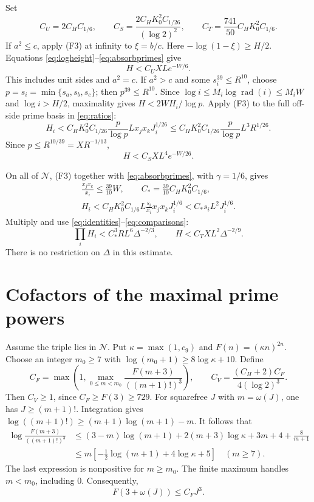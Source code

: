 \documentclass{amsart}
\theoremstyle{remark}
\newcommand{\rad}{\operatorname{rad}}
\numberwithin{equation}{section}
\begin{document}
Set
\begin{equation}\label{eq:outerconstants}
C_U=2C_HC_{1/6},\qquad
C_S=\frac{2C_HK_0^2C_{1/26}}{(\log2)^2},\qquad
C_T=\frac{741}{50}C_HK_0^2C_{1/6}.
\end{equation}
If $a^2\le c$, apply (F3) at infinity to $\xi=b/c$.
Here $-\log(1-\xi)\ge H/2$.
Equations \eqref{eq:logheight}--\eqref{eq:absorbprimes} give
\begin{equation}\label{eq:U}
H<C_U XL e^{-W/6}.
\end{equation}
This includes unit sides and $a^2=c$.
If $a^2>c$ and some $s_i^{39}\le R^{10}$, choose
$p=s_i=\min\{s_a,s_b,s_c\}$; then $p^{39}\le R^{10}$.
Since $\log i\le M_i\log\rad(i)\le M_iW$ and $\log i>H/2$,
maximality gives $H<2WH_i/\log p$.
Apply (F3) to the full off-side prime basis in \eqref{eq:ratios}:
\[
H_i<C_HK_0^2C_{1/26}\frac p{\log p}Lx_jx_kJ_i^{1/26}
 \le C_HK_0^2C_{1/26}\frac p{\log p}L^3R^{1/26}.
\]
Since $p\le R^{10/39}=X R^{-1/13}$,
\begin{equation}\label{eq:S}
H<C_S XL^4e^{-W/26}.
\end{equation}

On all of $\mathcal N$, (F3) together with \eqref{eq:absorbprimes},
with $\gamma=1/6$, gives
\[
\begin{gathered}
\frac{x_jx_k}{x_i}\le\frac{39}{10}W,\qquad
C_*=\frac{39}{10}C_HK_0^2C_{1/6},\\
H_i<C_HK_0^2C_{1/6}L\frac{s_i}{x_i}x_jx_kJ_i^{1/6}
 <C_*s_iL^2J_i^{1/6}.
\end{gathered}
\]
Multiply and use \eqref{eq:identities}--\eqref{eq:comparisons}:
\begin{equation}\label{eq:thick}
\prod_iH_i<C_*^3RL^6\Delta^{-2/3},\qquad
H<C_T XL^2\Delta^{-2/9}.
\end{equation}
There is no restriction on $\Delta$ in this estimate.

\section{Cofactors of the maximal prime powers}\label{sec:cap}
Assume the triple lies in $\mathcal N$.
Put $\kappa=\max(1,c_9)$ and $F(n)=(\kappa n)^{2n}$.
Choose an integer $m_0\ge7$ with $\log(m_0+1)\ge8\log\kappa+10$.
Define
\begin{equation}\label{eq:CV}
C_F=\max\left(1,\max_{0\le m<m_0}
 \frac{F(m+3)}{((m+1)!)^3}\right),\qquad
C_V=\frac{(C_H+2)C_F}{4(\log2)^3}.
\end{equation}
Then $C_V\ge1$, since $C_F\ge F(3)\ge729$.
For squarefree $J$ with $m=\omega(J)$, one has $J\ge(m+1)!$.
Integration gives $\log((m+1)!)\ge(m+1)\log(m+1)-m$.
It follows that
\[
\begin{split}
\log\frac{F(m+3)}{((m+1)!)^3}
&\le(3-m)\log(m+1)+2(m+3)\log\kappa+3m+4+\frac8{m+1}\\
&\le m\left[-\tfrac12\log(m+1)+4\log\kappa+5\right]\quad(m\ge7).
\end{split}
\]
The last expression is nonpositive for $m\ge m_0$.
The finite maximum handles $m<m_0$, including $0$.
Consequently,
\begin{equation}\label{eq:factorial}
F(3+\omega(J))\le C_F J^3.
\end{equation}
\end{document}
